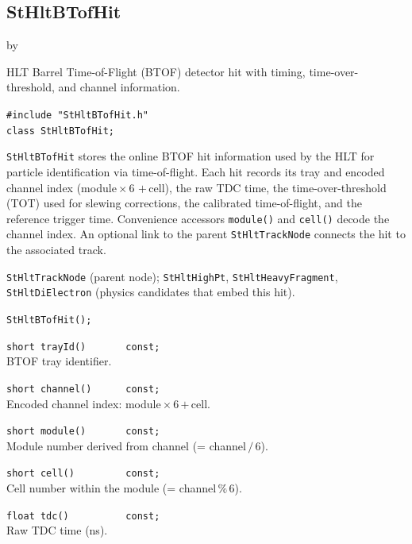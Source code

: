 \documentclass[twoside]{article}
\newcommand{\entrylabel}[1]{\mbox{\textbf{{#1}}}\hfil}%
\newenvironment{entry}
{\begin{list}{}%
    {\renewcommand{\makelabel}{\entrylabel}%
     \setlength{\labelwidth}{90pt}%
     \setlength{\leftmargin}{\labelwidth}
     \advance\leftmargin by \labelsep%
      }%
    }%
  {\end{list}}
\newcommand{\Entrylabel}[1]%
{\raisebox{0pt}[1ex][0pt]{\makebox[\labelwidth][l]%
    {\parbox[t]{\labelwidth}{\hspace{0pt}\textbf{{#1}}}}}}
\newenvironment{Entry}%
{\renewcommand{\entrylabel}{\Entrylabel}\begin{entry}}%
  {\end{entry}}
\begin{document}
\subsection{StHltBTofHit}
\label{sec:StHltBTofHit}
\begin{Entry}
\item[Summary] HLT Barrel Time-of-Flight (BTOF) detector hit with
    timing, time-over-threshold, and channel information.
\item[Synopsis]
    \verb+#include "StHltBTofHit.h"+\\
    \verb+class StHltBTofHit;+\\
\item[Description]
    \texttt{StHltBTofHit} stores the online BTOF hit information used
    by the HLT for particle identification via time-of-flight.  Each
    hit records its tray and encoded channel index (module\,$\times$\,6
    $+$\,cell), the raw TDC time, the time-over-threshold (TOT) used
    for slewing corrections, the calibrated time-of-flight, and the
    reference trigger time.  Convenience accessors \texttt{module()}
    and \texttt{cell()} decode the channel index.  An optional link to
    the parent \texttt{StHltTrackNode} connects the hit to the
    associated track.
\item[Related Classes]
    \texttt{StHltTrackNode} (parent node);
    \texttt{StHltHighPt}, \texttt{StHltHeavyFragment},
    \texttt{StHltDiElectron} (physics candidates that embed this hit).
\item[Public\\ Constructors]
    \verb+StHltBTofHit();+\\
\item[Public Member\\ Functions]
    \verb+short trayId()       const;+\\
    BTOF tray identifier.

    \verb+short channel()      const;+\\
    Encoded channel index: module\,$\times$\,6\,$+$\,cell.

    \verb+short module()       const;+\\
    Module number derived from channel (= channel\,$/$\,6).

    \verb+short cell()         const;+\\
    Cell number within the module (= channel\,$\%$\,6).

    \verb+float tdc()          const;+\\
    Raw TDC time (ns).


\end{Entry}
\end{document}
